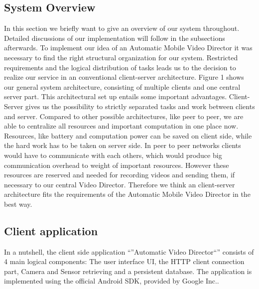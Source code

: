 \documentclass[conference]{IEEEtran}
\begin{document}
\subsection{System Overview}
In this section we briefly want to give an overview of our system throughout. Detailed discussions of our implementation will follow in the subsections afterwards. 
To implement our idea of an Automatic Mobile Video Director it was necessary to find the right structural organization for our system. Restricted requirements and the logical distribution of tasks leads us to the decision to realize our service in an conventional client-server architecture. Figure 1 shows our general system architecture, consisting of multiple clients and one central server part.
This architectural set up entails some important advantages. Client-Server gives us the possibility to strictly separated tasks and work between clients and server. Compared to other possible architectures, like peer to peer, we are able  to centralize all resources and important computation in one place now. Resources, like battery and computation power can be saved on client side, while the hard work has to be taken on server side. In peer to peer networks clients would have to communicate with each others, which would produce big communication overhead to weight of important resources. However these resources are reserved and needed for recording videos and sending them, if necessary to our central Video Director. Therefore we think an client-server architecture fits the requirements of the Automatic Mobile Video Director in the best way. 


\subsection{Client application}

In a nutshell, the client side application ``''Automatic Video Director``'' consists of 4 main logical components: The user interface UI, the HTTP client connection part, Camera and Sensor retrieving and a persistent database.
The application is implemented using the official Android SDK, provided by Google Inc..
\end{document}
